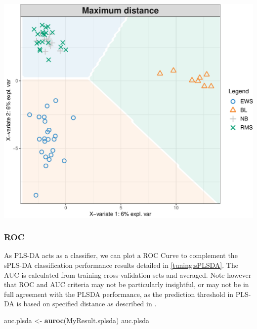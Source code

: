 \documentclass[]{book}
\newenvironment{Shaded}{\begin{snugshade}}{\end{snugshade}}
\newcommand{\DataTypeTok}[1]{\textcolor[rgb]{0.13,0.29,0.53}{#1}}
\newcommand{\DecValTok}[1]{\textcolor[rgb]{0.00,0.00,0.81}{#1}}
\newcommand{\KeywordTok}[1]{\textcolor[rgb]{0.13,0.29,0.53}{\textbf{#1}}}
\newcommand{\NormalTok}[1]{#1}
\newcommand{\OperatorTok}[1]{\textcolor[rgb]{0.81,0.36,0.00}{\textbf{#1}}}
\newcommand{\OtherTok}[1]{\textcolor[rgb]{0.56,0.35,0.01}{#1}}
\newcommand{\StringTok}[1]{\textcolor[rgb]{0.31,0.60,0.02}{#1}}
\begin{document}
\begin{Shaded}
\end{Shaded}

\begin{center}\includegraphics[width=0.5\linewidth]{Figures/04-plsda-background-1} \end{center}

\hypertarget{roc}{%
\subsubsection{ROC}\label{roc}}

As PLS-DA acts as a classifier, we can plot a ROC Curve to complement the sPLS-DA classification performance results detailed in \ref{tuning:sPLSDA}. The AUC is calculated from training cross-validation sets and averaged. Note however that ROC and AUC criteria may not be particularly insightful, or may not be in full agreement with the PLSDA performance, as the prediction threshold in PLS-DA is based on specified distance as described in \citep{mixomics}.

\begin{Shaded}
\begin{Highlighting}[]
\NormalTok{auc.plsda <-}\StringTok{ }\KeywordTok{auroc}\NormalTok{(MyResult.splsda)}
\NormalTok{auc.plsda}
\end{Highlighting}
\end{Shaded}
\end{document}
